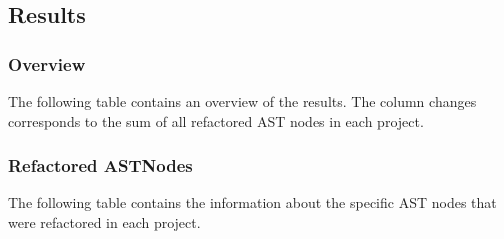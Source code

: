 \documentclass[type=bsc,accentcolor=tud9c]{tudthesis}
\begin{document}
\newpage
\subsection{Results}
\subsubsection{Overview}
The following table contains an overview of the results. The column changes corresponds to the sum of all refactored AST nodes in each project.
\label{appendix:eval-results-overview}


\newpage
\subsubsection{Refactored ASTNodes}
The following table contains the information about the specific AST nodes that were refactored in each project.
\label{appendix:eval-details}

\end{document}
